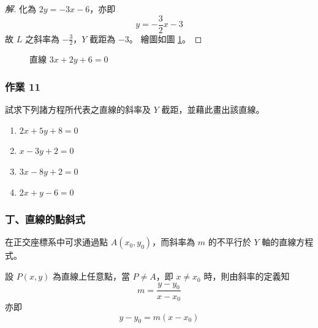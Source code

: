 \begin{proof}[解]
化為 $2y = -3x - 6$，亦即
\[ y = -\frac{3}{2}x - 3 \]
故 $L$ 之斜率為 $-\frac{3}{2}$，$Y$ 截距為 $-3$。
繪圖如圖 \ref{fig:4-18}。
\end{proof}

\begin{figure}[H]
\centering
{}
\caption{直線 $3x+2y+6=0$}
\label{fig:4-18}
\end{figure}

\subsubsection*{作業 11}
試求下列諸方程所代表之直線的斜率及 $Y$ 截距，並藉此畫出該直線。
\begin{enumerate}[label=(\roman*), leftmargin=2em]
  \item $2x + 5y + 8 = 0$
  \item $x - 3y + 2 = 0$
  \item $3x - 8y + 2 = 0$
  \item $2x + y - 6 = 0$
\end{enumerate}

\subsubsection*{丁、直線的點斜式}

在正交座標系中可求通過點 $A(x_0, y_0)$，而斜率為 $m$ 的不平行於 $Y$ 軸的直線方程式。

設 $P(x, y)$ 為直線上任意點，當 $P \neq A$，即 $x \neq x_0$ 時，則由斜率的定義知
\[ m = \frac{y - y_0}{x - x_0} \]
亦即
\begin{equation}
y - y_0 = m(x - x_0)
\label{eq:b3s-4-11}
\end{equation}

